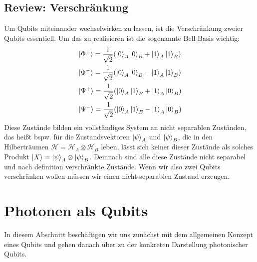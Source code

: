 \documentclass[11pt]{article}
\begin{document}
\subsection{Review: Verschränkung}
Um Qubits miteinander wechselwirken zu lassen, ist die Verschränkung zweier Qubits essentiell. Um das zu realisieren ist die sogenannte
Bell Basis wichtig:
\begin{align*}
    &\ket{\Phi^+} = \frac{1}{\sqrt{2}}(\ket{0}_A\ket{0}_B+\ket{1}_A\ket{1}_B)\\
    &\ket{\Phi^-} = \frac{1}{\sqrt{2}}(\ket{0}_A\ket{0}_B-\ket{1}_A\ket{1}_B)\\
    &\ket{\Psi^+} = \frac{1}{\sqrt{2}}(\ket{0}_A\ket{1}_B+\ket{1}_A\ket{0}_B)\\
    &\ket{\Psi^-} = \frac{1}{\sqrt{2}}(\ket{0}_A\ket{1}_B-\ket{1}_A\ket{0}_B)\\
\end{align*}
Diese Zustände bilden ein vollständiges System an nicht separablen Zuständen, das heißt bspw. für die Zustandsvektoren $\ket{\psi}_A$
und $\ket{\psi}_B$, die in den Hilberträumen $\mathcal{H} = \mathcal{H}_A \otimes \mathcal{H}_B$ leben, lässt sich keiner dieser
Zustände als solches Produkt $\ket{X} = \ket{\psi}_A \otimes \ket{\psi}_B$. Demnach sind alle diese Zustände nicht separabel und
nach definition verschränkte Zustände. Wenn wir also zwei Qubits verschränken wollen müssen wir einen nicht-separablen Zustand 
erzeugen.
\newpage
\section{Photonen als Qubits}
In diesem Abschnitt beschäftigen wir uns zunächst mit dem allgemeinen Konzept eines Qubits und gehen danach über zu der konkreten
Darstellung photonischer Qubits.
\end{document}
